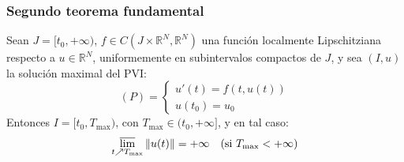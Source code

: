 \subsubsection{Segundo teorema fundamental}

\begin{teorema}
    Sean $J = [t_0, +\infty)$, $f \in C(J \times \mathbb{R}^N, \mathbb{R}^N)$ una función localmente Lipschitziana respecto a $u \in \mathbb{R}^N$, uniformemente en subintervalos compactos de $J$, y sea $(I, u)$ la solución maximal del PVI:
    \[
        (P) =
        \begin{cases}
            u'(t) = f(t, u(t)) \\
            u(t_0) = u_0
        \end{cases}
    \]
    Entonces $I = [t_0, T_{\text{max}})$, con $T_{\text{max}} \in (t_0, +\infty]$, y en tal caso:
    \[
        \varlimsup_{t \nearrow T_{\text{max}}} \| u(t) \| = +\infty \quad \text{(si } T_{\text{max}} < +\infty \text{)}
    \]    
\end{teorema}

